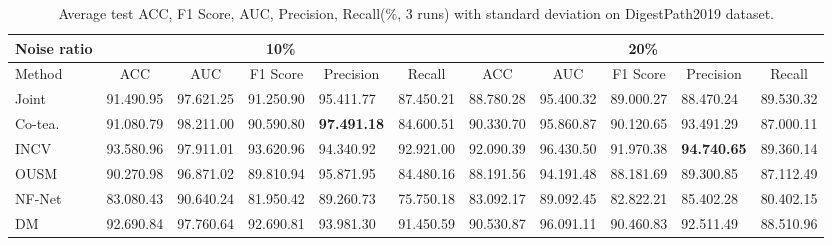 \begin{table*}[]
\scriptsize
\centering
\caption{{Average test ACC, F1 Score, AUC, {Precision}, Recall(\%, 3 runs) with standard deviation on DigestPath2019 dataset.}}
\label{table:objMiccai}
\begin{tabular}{@{}lllllllllll@{}}
\toprule
\multicolumn{1}{c}{Noise ratio} & \multicolumn{5}{c}{10\%}                                                                                                                & \multicolumn{5}{c}{20\%}                                                                                                                \\ \midrule
Method                & \multicolumn{1}{c}{ACC} & \multicolumn{1}{c}{AUC} & \multicolumn{1}{c}{F1 Score} & \multicolumn{1}{c}{{Precision}} & \multicolumn{1}{c}{Recall} & \multicolumn{1}{c}{ACC} & \multicolumn{1}{c}{AUC} & \multicolumn{1}{c}{F1 Score} & \multicolumn{1}{c}{{Precision}} & \multicolumn{1}{c}{Recall} \\ \midrule
Joint                     & 91.490.95          & 97.621.25          & 91.250.90               & 95.411.77          & 87.450.21             & 88.780.28          & 95.400.32          & 89.000.27               & 88.470.24          & 89.530.32             \\
Co-tea.                     & 91.080.79          & 98.211.00          & 90.590.80               & \textbf{97.491.18} & 84.600.51             & 90.330.70          & 95.860.87          & 90.120.65               & 93.491.29          & 87.000.11             \\
INCV                            & 93.580.96          & 97.911.01          & 93.620.96               & 94.340.92          & 92.921.00             & 92.090.39          & 96.430.50          & 91.970.38               & \textbf{94.740.65} & 89.360.14             \\
OUSM                       & 90.270.98          & 96.871.02          & 89.810.94               & 95.871.95          & 84.480.16             & 88.191.56          & 94.191.48          & 88.181.69               & 89.300.85          & 87.112.49             \\
NF-Net                          & 83.080.43          & 90.640.24          & 81.950.42               & 89.260.73          & 75.750.18             & 83.092.17          & 89.092.45          & 82.822.21               & 85.402.28          & 80.402.15             \\
DM                       & 92.690.84          & 97.760.64          & 92.690.81               & 93.981.30          & 91.450.59             & 90.530.87          & 96.091.11          & 90.460.83               & 92.511.49          & 88.510.96             \\

\end{tabular}
\end{table*}
